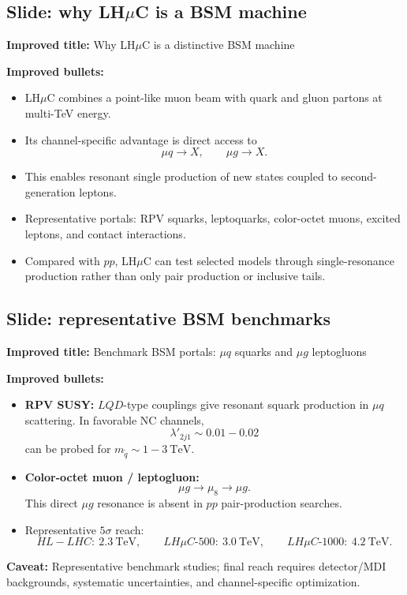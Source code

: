 \documentclass[11pt,a4paper]{article}
\newcommand{\LHmuC}{LH\ensuremath{\mu}C}
\newcommand{\HL}{HL-LHC}
\newcommand{\tev}{\ensuremath{~\mathrm{TeV}}}
\begin{document}
\subsection{Slide: why \LHmuC{} is a BSM machine}

\textbf{Improved title:} Why \LHmuC{} is a distinctive BSM machine

\textbf{Improved bullets:}
\begin{itemize}[leftmargin=*]
  \item \LHmuC{} combines a point-like muon beam with quark and gluon partons at multi-TeV energy.
  \item Its channel-specific advantage is direct access to
  \[
    \mu q\to X,\qquad \mu g\to X.
  \]
  \item This enables resonant single production of new states coupled to second-generation leptons.
  \item Representative portals: RPV squarks, leptoquarks, color-octet muons, excited leptons,
        and contact interactions.
  \item Compared with \(pp\), \LHmuC{} can test selected models through single-resonance production
        rather than only pair production or inclusive tails.
\end{itemize}

\subsection{Slide: representative BSM benchmarks}

\textbf{Improved title:} Benchmark BSM portals: \(\mu q\) squarks and \(\mu g\) leptogluons

\textbf{Improved bullets:}
\begin{itemize}[leftmargin=*]
  \item \textbf{RPV SUSY:} \(LQD\)-type couplings give resonant squark production in
        \(\mu q\) scattering.  In favorable NC channels,
  \[
    \lambda'_{2j1}\sim0.01{-}0.02
  \]
  can be probed for \(m_{\tilde q}\sim1{-}3\tev\).
  \item \textbf{Color-octet muon / leptogluon:}
  \[
    \mu g\to\mu_8\to\mu g.
  \]
  This direct \(\mu g\) resonance is absent in \(pp\) pair-production searches.
  \item Representative \(5\sigma\) reach:
  \[
    \HL:\ 2.3\tev,\qquad
    \LHmuC\text{-}500:\ 3.0\tev,\qquad
    \LHmuC\text{-}1000:\ 4.2\tev.
  \]
\end{itemize}

\textbf{Caveat:}
Representative benchmark studies; final reach requires detector/MDI backgrounds, systematic
uncertainties, and channel-specific optimization.
\end{document}
